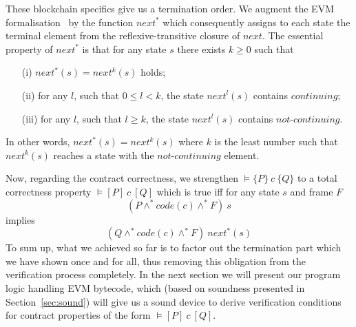 \documentclass[sigplan,10pt,review]{acmart}\settopmatter{printfolios=true,printccs=false,printacmref=false}
\newcommand{\sconj}{\wedge^*}
\newcommand{\pvalid}[3]{\models\{#1\}\:#2\:\{#3\}}
\newcommand{\tvalid}[3]{\models[#1]\:#2\:[#3]}
\newcommand{\xnext}{\mathit{next}}
\newcommand{\code}[1]{\mathit{code}(#1)}
\newcommand{\cont}{\mathit{continuing}}
\newcommand{\ncont}{\mathit{not\mbox{-}continuing}}
\begin{document}
These blockchain specifics give us a termination order. We 
augment the EVM formalisation~\cite{Yoichi} by the function $\xnext^*$ which 
consequently assigns to each state the terminal element from the reflexive-transitive closure of $\xnext$. 
The essential property of $\xnext^*$ is that for any state $s$ there exists $k \geq 0$ such that
\begin{itemize}
\item[(i)] $\xnext^*(s) = \xnext^k(s)$ holds;
\item[(ii)] for any $l$, such that $0 \le l < k$, the state $\xnext^l(s)$ contains $\cont$;
%
\item[(iii)] for any $l$, such that $l \ge k$, the state $\xnext^l(s)$ contains $\ncont$.
\end{itemize}
In other words, $\xnext^*(s) = \xnext^k(s)$ where $k$ is the least number such that
$\xnext^k(s)$ reaches a state with the $\ncont$ element. 

Now, regarding the contract correctness, we strengthen $\pvalid{P}{c}{Q}$ to 
a total correctness property $\tvalid{P}{c}{Q}$ which is true iff
for any state $s$ and frame $F$ 
\[
(P \sconj \code{c} \sconj F)\: s
\] 
implies 
\[
(Q \sconj \code{c} \sconj F)\: \xnext^*(s)
\] 
To sum up, what we achieved so far is to factor out the termination part which we have 
shown once and for all, thus removing this obligation from the verification
process completely. In the next section we will present our program logic handling EVM bytecode, 
which (based on soundness presented in Section~\ref{sec:sound}) will give us 
a sound device to derive verification conditions for contract properties of the form $\tvalid{P}{c}{Q}$.   
%       
\end{document}
